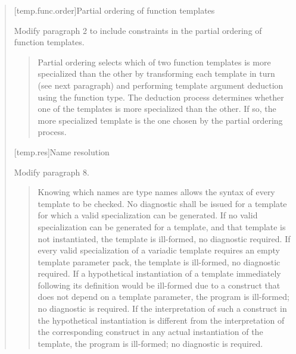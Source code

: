 \begin{quote}
[temp.func.order]{Partial ordering of function templates}

Modify paragraph 2 to include constraints in the partial ordering
of function templates.

\begin{quote}
\setcounter{Paras}{1}
\pnum
Partial ordering selects which of two function templates is 
more specialized than the other by transforming each template 
in turn (see next paragraph) and performing template argument 
deduction using the function type. The deduction process 
determines whether one of the templates is more specialized 
than the other.
% 
If so, the more specialized template is the one chosen by the 
partial ordering process. 
% 
\end{quote}

[temp.res]{Name resolution}

Modify paragraph 8.

\begin{quote}
\setcounter{Paras}{7}
\pnum
Knowing which names are type names allows the syntax of every
template to be checked. No diagnostic shall be issued for a template
for which a valid specialization can be generated. If no valid
specialization can be generated for a template, and that template is
not instantiated, the template is ill-formed, no diagnostic
required. If every valid specialization of a variadic template
requires an empty template parameter pack, the template is
ill-formed, no diagnostic required. 
% 
% 
% 
If a hypothetical instantiation of a template immediately following
its definition would be ill-formed due to a construct that does not
depend on a template parameter, the program is ill-formed; no
diagnostic is required. If the interpretation of such a construct in
the hypothetical instantiation is different from the interpretation
of the corresponding construct in any actual instantiation of the
template, the program is ill-formed; no diagnostic is required.
\end{quote}


\end{quote}
